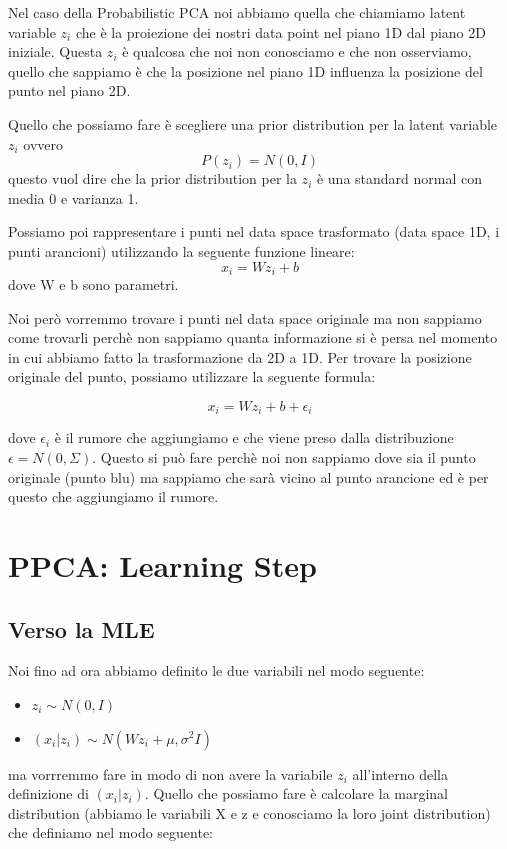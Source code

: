 \documentclass[14pt]{extreport}
\begin{document}
Nel caso della Probabilistic PCA noi abbiamo quella che chiamiamo latent variable $z_i$ che è la proiezione dei nostri data point 
nel piano 1D dal piano 2D iniziale. Questa $z_i$ è qualcosa che noi non conosciamo e che non osserviamo, quello che sappiamo è che 
la posizione nel piano 1D influenza la posizione del punto nel piano 2D.

Quello che possiamo fare è scegliere una prior distribution per la latent variable $z_i$ ovvero $$P(z_i) = N(0,I)$$ 
questo vuol dire che la prior distribution per la $z_i$ è una standard normal con media 0 e varianza 1.

Possiamo poi rappresentare i punti nel data space trasformato (data space 1D, i punti arancioni) utilizzando la seguente
funzione lineare: $$x_i = W z_i + b$$ 
dove W e b sono parametri.

Noi però vorremmo trovare i punti nel data space originale ma non sappiamo come trovarli perchè non sappiamo quanta informazione
si è persa nel momento in cui abbiamo fatto la trasformazione da 2D a 1D.
Per trovare la posizione originale del punto, possiamo utilizzare la seguente formula: 
 
$$x_i = W z_i + b + \epsilon_i$$

dove $\epsilon_i$ è il rumore che aggiungiamo e che viene preso dalla distribuzione $\epsilon = N(0, \Sigma)$.
Questo si può fare perchè noi non sappiamo dove sia il punto originale (punto blu) ma sappiamo che sarà vicino al punto 
arancione ed è per questo che aggiungiamo il rumore.




\section{PPCA: Learning Step}

\subsection{Verso la MLE}

Noi fino ad ora abbiamo definito le due variabili nel modo seguente:

\begin{itemize}
\item $z_i \sim N(0, I)$
\item $(x_i | z_i) \sim N(Wz_i + \mu, \sigma^2I)$
\end{itemize}

ma vorrremmo fare in modo di non avere la variabile $z_i$ all'interno della definizione di $(x_i | z_i)$. 
Quello che possiamo fare è calcolare la marginal distribution (abbiamo le variabili X e z e conosciamo la loro joint distribution) che definiamo nel modo seguente:
\end{document}
